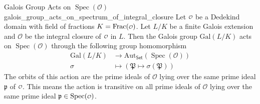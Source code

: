 \begin{proposition}{Galois Group Acts on $\operatorname{Spec}\left(\mathcal{O}\right)$}{galois_group_acts_on_spectrum_of_integral_closure}
    Let $\mathcalo$ be a Dedekind domain with field of fractions $K=\mathrm{Frac}(\mathcalo)$. Let $L/K$ be a finite Galois extension and $\mathcal{O}$ be the integral closure of $\mathcalo$ in $L$. Then the Galois group $\mathrm{Gal}(L/K)$ acts on $\operatorname{Spec}\left(\mathcal{O}\right)$ through the following group homomorphism
    \begin{align*}
        \mathrm{Gal}(L/K)&\longrightarrow \mathrm{Aut}_{\mathsf{Set}}\left(\operatorname{Spec}\left(\mathcal{O}\right)\right)\\
        \sigma&\longmapsto \left(\mathfrak{P}\longmapsto\sigma\left(\mathfrak{P}\right)\right)
    \end{align*}
    The orbits of this action are the prime ideals of $\mathcal{O}$ lying over the same prime ideal $\mathfrak{p}$ of $\mathcalo$. This means the action is transitive on all prime ideals of $\mathcal{O}$ lying over the same prime ideal $\mathfrak{p}\in \spec(\mathcalo)$.
\end{proposition}
